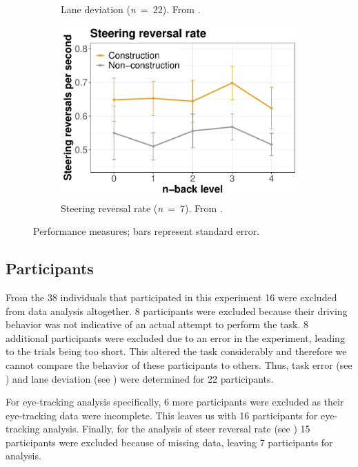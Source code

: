 \begin{figure}
\begin{subfigure}[b]{0.3\textwidth}
    \caption{Lane deviation (\textit{n}\ =\ 22). From \citet{Kelapanda2021}.}
    \label{fig:lane-deviation}
  \end{subfigure}
  \hfill
  \begin{subfigure}[b]{0.3\textwidth}
    \centering
    \includegraphics[width=\textwidth]{images/steering_reversal.pdf}
    \caption{Steering reversal rate (\textit{n}\ =\ 7). From \citet{Kelapanda2021}.}
    \label{fig:steering-reversal}
  \end{subfigure}
     \caption{Performance measures; bars represent standard error.}
     \label{fig:performance}
\end{figure}

\subsection{Participants}
From the 38 individuals that participated in this experiment 16 were excluded from data analysis altogether.
8 participants were excluded because their driving behavior was not indicative of an actual attempt to perform the task.
8 additional participants were excluded due to an error in the experiment, leading to the trials being too short.
This altered the task considerably and therefore we cannot compare the behavior of these participants to others.
Thus, task error (see \citealp{DeMooij2021}) and lane deviation (see \citealp{Kelapanda2021}) were determined for 22 participants. 

For eye-tracking analysis specifically, 6 more participants were excluded as their eye-tracking data were incomplete. 
This leaves us with 16 participants for eye-tracking analysis.
Finally, for the analysis of steer reversal rate (see \citealp{Kelapanda2021}) 15 participants were excluded because of missing data, leaving 7 participants for analysis.

